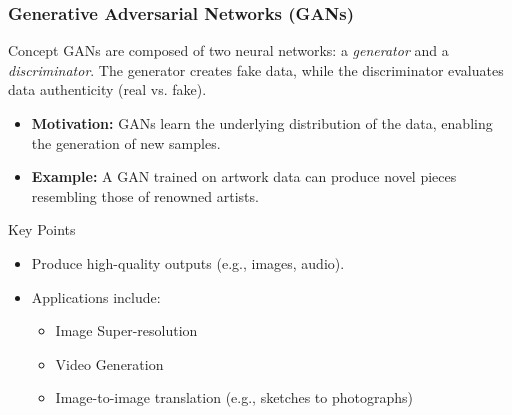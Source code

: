 \documentclass[aspectratio=169]{beamer}
\begin{document}
\begin{frame}[fragile]
    \frametitle{Generative Adversarial Networks (GANs)}
    
    \begin{block}{Concept}
        GANs are composed of two neural networks: a \textit{generator} and a \textit{discriminator}. The generator creates fake data, while the discriminator evaluates data authenticity (real vs. fake).
    \end{block}

    \begin{itemize}
        \item \textbf{Motivation:} GANs learn the underlying distribution of the data, enabling the generation of new samples.
        \item \textbf{Example:} A GAN trained on artwork data can produce novel pieces resembling those of renowned artists.
    \end{itemize}

    \begin{block}{Key Points}
        \begin{itemize}
            \item Produce high-quality outputs (e.g., images, audio).
            \item Applications include:
                \begin{itemize}
                    \item Image Super-resolution
                    \item Video Generation
                    \item Image-to-image translation (e.g., sketches to photographs)
                \end{itemize}
        \end{itemize}
    \end{block}
\end{frame}
\end{document}
